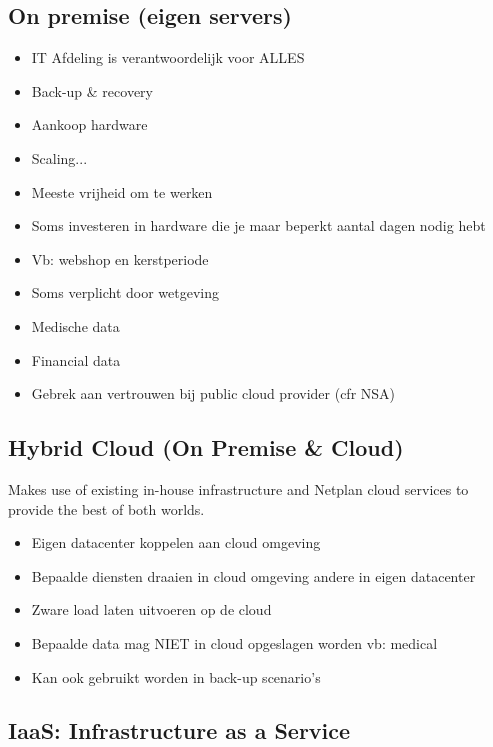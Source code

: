 \documentclass{article}
\begin{document}
\subsection{On premise (eigen servers)}

\begin{itemize}
    \item IT Afdeling is verantwoordelijk voor ALLES
    \item Back-up \& recovery
    \item Aankoop hardware
    \item Scaling...
    \item Meeste vrijheid om te werken
    \item Soms investeren in hardware die je maar beperkt aantal dagen nodig hebt
    \item Vb: webshop en kerstperiode
    \item Soms verplicht door wetgeving
    \item Medische data
    \item Financial data
    \item Gebrek aan vertrouwen bij public cloud provider (cfr NSA)
\end{itemize}

\subsection{Hybrid Cloud (On Premise \& Cloud)}
Makes use of existing in-house infrastructure and Netplan cloud services to provide the best of both worlds.

\begin{itemize}
    \item Eigen datacenter koppelen aan cloud omgeving
    \item Bepaalde diensten draaien in cloud omgeving andere in eigen datacenter
    \item Zware load laten uitvoeren op de cloud
    \item Bepaalde data mag NIET in cloud opgeslagen worden vb: medical
    \item Kan ook gebruikt worden in back-up scenario’s
\end{itemize}

\subsection{IaaS: Infrastructure as a Service}
\end{document}
